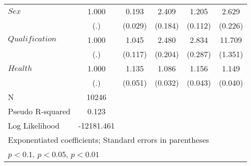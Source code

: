 {\begin{tabular}{l*{5}{c}}
$\mathit{Sex}$&       1.000         &       0.193\sym{***}&       2.409\sym{***}&       1.205\sym{**} &       2.629\sym{***}\\
            &         (.)         &     (0.029)         &     (0.184)         &     (0.112)         &     (0.226)         \\
$\mathit{Qualification}$&       1.000         &       1.045         &       2.480\sym{***}&       2.834\sym{***}&      11.709\sym{***}\\
            &         (.)         &     (0.117)         &     (0.204)         &     (0.287)         &     (1.351)         \\
$\mathit{Health}$&       1.000         &       1.135\sym{***}&       1.086\sym{***}&       1.156\sym{***}&       1.149\sym{***}\\
            &         (.)         &     (0.051)         &     (0.032)         &     (0.043)         &     (0.040)         \\
\hline
N           &       10246         &                     &                     &                     &                     \\
Pseudo R-squared&       0.123         &                     &                     &                     &                     \\
Log Likelihood&  -12181.461         &                     &                     &                     &                     \\
\hline\hline
\multicolumn{6}{l}{\footnotesize Exponentiated coefficients; Standard errors in parentheses}\\
\multicolumn{6}{l}{\footnotesize \sym{*} \(p<0.1\), \sym{**} \(p<0.05\), \sym{***} \(p<0.01\)}\\
\end{tabular}
}
